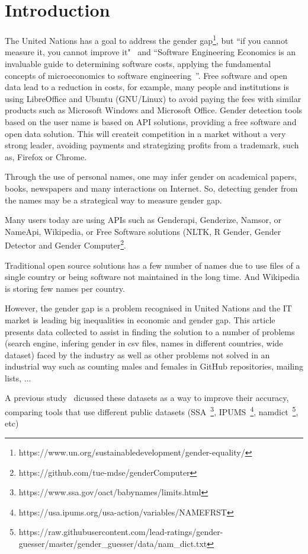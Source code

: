 \documentclass[a4paper]{article}
\begin{document}
\section{Introduction}
The United Nations has a goal to address the gender
gap\footnote{https://www.un.org/sustainabledevelopment/gender-equality/},
but ``if you cannot measure it, you cannot improve it"~\cite{thompson1833electrical}
and ``Software Engineering Economics is an invaluable guide to determining
software costs, applying the fundamental concepts of microeconomics
to software engineering~\cite{barry1981software}''. Free software and open
data lead to a reduction in costs, for example, many people and
institutions is using LibreOffice and Ubuntu (GNU/Linux) to avoid paying
the fees with similar products such as Microsoft Windows and Microsoft
Office. Gender detection tools based on the user name is based on API
solutions, providing a free software and open data solution. This will
createit competition in a market without a very strong leader, avoiding
payments and strategizing profits from a trademark, such as, Firefox or
Chrome.

Through the use of personal names, one may infer gender on
academical papers, books, newspapers and many interactions on Internet.
So, detecting gender from the names may be a strategical way to
measure gender gap.

Many users today are using APIs such as Genderapi, Genderize,
Namsor, or NameApi, Wikipedia, or Free Software solutions
(NLTK\cite{loper2002nltk}, R Gender, Gender Detector and Gender
Computer\footnote{https://github.com/tue-mdse/genderComputer}.

Traditional open source solutions has a few number of names due to
use files of a single country or being software not maintained in
the long time. And Wikipedia is storing few names per country.

However, the gender gap is a problem recognised in United Nations and
the IT market is leading big inequalities in economic and gender gap.
This article presents data collected to assist in finding the solution
to a number of problems (search engine, infering gender in csv files,
names in different countries, wide dataset) faced by
the industry as well as other problems not solved in an industrial way
such as counting males and females in GitHub repositories, mailing lists,
...

A previous study~\cite{karimi2016inferring} dicussed these datasets as
a way to improve their accuracy, comparing tools that use different
public datasets (SSA~\footnote{https://www.ssa.gov/oact/babynames/limits.html},
IPUMS~\footnote{https://usa.ipums.org/usa-action/variables/NAMEFRST},
namdict~\footnote{https://raw.githubusercontent.com/lead-ratings/gender-guesser/master/gender\_guesser/data/nam\_dict.txt}, etc)
\end{document}
